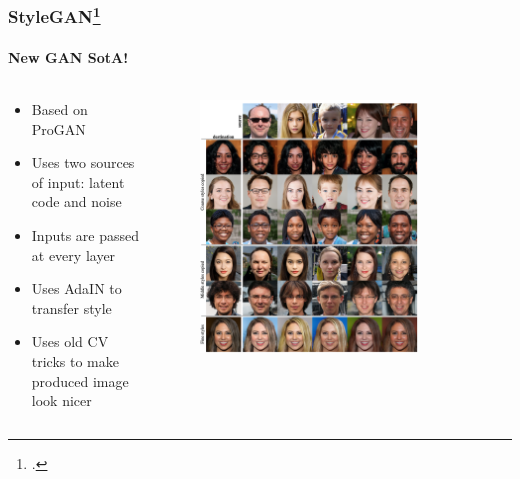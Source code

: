 \documentclass[10pt]{beamer}
\begin{document}
\begin{frame}
\frametitle{StyleGAN\footcite{StyleGAN}}
\framesubtitle{New GAN SotA!}

\begin{columns}
\begin{column}{6cm}

\begin{itemize}
    \item Based on ProGAN
    \item Uses two sources of input: latent code and noise
    \item Inputs are passed at every layer
    \item Uses AdaIN to transfer style
    \item Uses old CV tricks to make produced image look nicer
\end{itemize}

\end{column}
\begin{column}{6cm}

\begin{figure}
    \centering
    \includegraphics[width=0.8\textwidth]{images/style-gan-style-transfer}
\end{figure}

\end{column}
\end{columns}

\end{frame}
\end{document}
